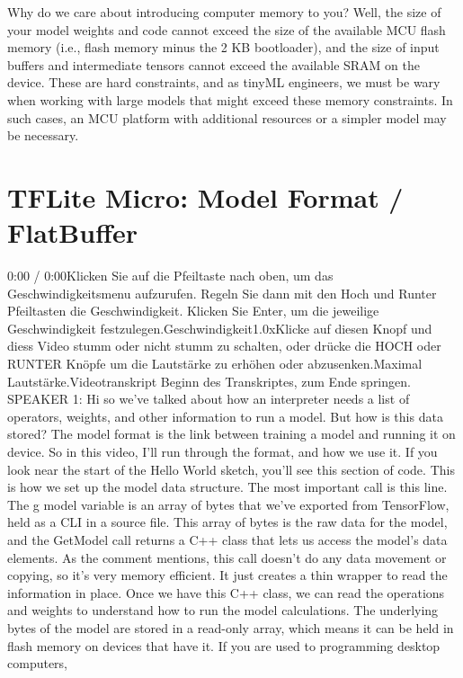     Why do we care about introducing computer memory to you? Well, the size of your model weights and code cannot exceed the size of the available MCU flash memory (i.e., flash memory minus the 2 KB bootloader), and the size of input buffers and intermediate tensors cannot exceed the available SRAM on the device. These are hard constraints, and as tinyML engineers, we must be wary when working with large models that might exceed these memory constraints. In such cases, an MCU platform with additional resources or a simpler model may be necessary.  
    
\section{TFLite Micro: Model Format / FlatBuffer}

    0:00 / 0:00Klicken Sie auf die Pfeiltaste nach oben, um das Geschwindigkeitsmenu aufzurufen. Regeln Sie dann mit den Hoch und Runter Pfeiltasten die Geschwindigkeit. Klicken Sie Enter, um die jeweilige Geschwindigkeit festzulegen.Geschwindigkeit1.0xKlicke auf diesen Knopf und diess Video stumm oder nicht stumm zu schalten, oder drücke die HOCH oder RUNTER Knöpfe um die Lautstärke zu erhöhen oder abzusenken.Maximal Lautstärke.Videotranskript
    Beginn des Transkriptes, zum Ende springen.
    SPEAKER 1: Hi so we've talked about how an interpreter needs
    a list of operators, weights, and other information to run a model.
    But how is this data stored?
    The model format is the link between training a model
    and running it on device.
    So in this video, I'll run through the format, and how we use it.
    If you look near the start of the Hello World sketch,
    you'll see this section of code.
    This is how we set up the model data structure.
    The most important call is this line.
    The g model variable is an array of bytes
    that we've exported from TensorFlow, held as a CLI in a source file.
    This array of bytes is the raw data for the model,
    and the GetModel call returns a C++ class that lets us access
    the model's data elements.
    As the comment mentions, this call doesn't
    do any data movement or copying, so it's very memory efficient.
    It just creates a thin wrapper to read the information in place.
    Once we have this C++ class, we can read the operations and weights
    to understand how to run the model calculations.
    The underlying bytes of the model are stored
    in a read-only array, which means it can be held in flash memory
    on devices that have it.
    If you are used to programming desktop computers,
